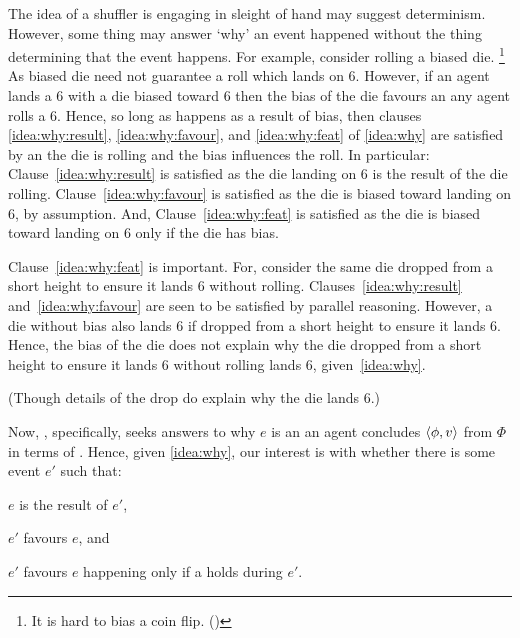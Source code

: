 \begin{note}
  The idea of a shuffler is engaging in sleight of hand may suggest determinism.
  However, some thing may answer `why' an event happened without the thing determining that the event happens.
  For example, consider rolling a biased die.%
  \footnote{
    It is hard to bias a coin flip. (\cite{Gelman:2002ww})
  }
  As biased die need not guarantee a roll which lands on 6.
  However, if an agent lands a 6 with a die biased toward 6 then the bias of the die favours an  any agent rolls a 6.
  Hence, so long as happens as a result of bias, then clauses \ref{idea:why:result}, \ref{idea:why:favour}, and \ref{idea:why:feat} of \autoref{idea:why} are satisfied by an  the die is rolling and the bias influences the roll.
  In particular:
  Clause~\ref{idea:why:result} is satisfied as the die landing on 6 is the result of the die rolling.
  Clause~\ref{idea:why:favour} is satisfied as the die is biased toward landing on 6, by assumption.
  And, Clause~\ref{idea:why:feat} is satisfied as the die is biased toward landing on 6 only if the die has bias.

  Clause~\ref{idea:why:feat} is important.
  For, consider the same die dropped from a short height to ensure it lands 6 without rolling.
  Clauses~\ref{idea:why:result} and~\ref{idea:why:favour} are seen to be satisfied by parallel reasoning.
  However, a die without bias also lands 6 if dropped from a short height to ensure it lands 6.
  Hence, the bias of the die does not explain why the die dropped from a short height to ensure it lands 6 without rolling lands 6, given~\autoref{idea:why}.

  (Though details of the drop do explain why the die lands 6.)
\end{note}


\begin{note}
  Now, \qWhy{}, specifically, seeks answers to why \(e\) is an  an agent concludes \(\langle\phi, v\rangle\) from \(\Phi\) in terms of .
  Hence, given \autoref{idea:why}, our interest is with whether there is some event \(e'\) such that:
  \begin{enumerate*}[label=]
  \item
    \(e\) is the result of \(e'\),
  \item
    \(e'\) favours \(e\), and
  \item
    \(e'\) favours \(e\) happening only if a \fofr{} holds during \(e'\).
  \end{enumerate*}
\end{note}


